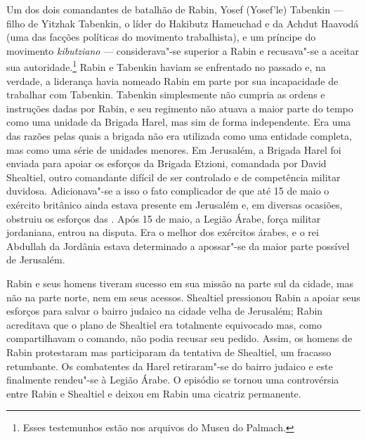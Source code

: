 Um dos dois comandantes de batalhão de Rabin, Yosef (Yosef'le) Tabenkin
--- filho de Yitzhak Tabenkin, o líder do Hakibutz Hameuchad e da Achdut
Haavodá (uma das facções políticas do movimento trabalhista), e um
príncipe do movimento \emph{kibutziano} --- considerava"-se superior a Rabin e
recusava"-se a aceitar sua autoridade.\footnote{Esses testemunhos estão nos arquivos do Museu do Palmach.} Rabin e Tabenkin haviam
se enfrentado no passado e, na verdade, a liderança havia nomeado Rabin
em parte por sua incapacidade de trabalhar com Tabenkin. Tabenkin
simplesmente não cumpria as ordens e instruções dadas por Rabin, e seu
regimento não atuava a maior parte do tempo como uma unidade da Brigada
Harel, mas sim de forma independente. Era uma das razões pelas quais a
brigada não era utilizada como uma entidade completa, mas como uma série
de unidades menores. Em Jerusalém, a Brigada Harel foi enviada para
apoiar os esforços da Brigada Etzioni, comandada por David Shealtiel,
outro comandante difícil de ser controlado e de competência militar
duvidosa. Adicionava"-se a isso o fato complicador de que até 15 de maio o
exército britânico ainda estava presente em Jerusalém e, em diversas
ocasiões, obstruiu os esforços das . Após 15 de maio, a Legião Árabe,
força militar jordaniana, entrou na disputa. Era o melhor dos exércitos
árabes, e o rei Abdullah da Jordânia estava determinado a apossar"-se da
maior parte possível de Jerusalém.

Rabin e seus homens tiveram sucesso em sua missão na parte sul da
cidade, mas não na parte norte, nem em seus acessos. Shealtiel
pressionou Rabin a apoiar seus esforços para salvar o bairro judaico na
cidade velha de Jerusalém; Rabin acreditava que o plano de Shealtiel era
totalmente equivocado mas, como compartilhavam o comando, não podia
recusar seu pedido. Assim, os homens de Rabin protestaram mas
participaram da tentativa de Shealtiel, um fracasso retumbante. Os
combatentes da Harel retiraram"-se do bairro judaico e este finalmente
rendeu"-se à Legião Árabe. O episódio se tornou uma
controvérsia entre Rabin e Shealtiel e deixou em Rabin uma cicatriz
permanente.


